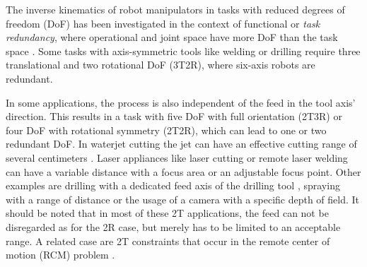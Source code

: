 \documentclass[graybox,vecphys]{svmult}
\begin{document}


The inverse kinematics of robot manipulators in tasks with reduced degrees of freedom (DoF) has been investigated in the context of functional or \emph{task redundancy}, where operational and joint space have more DoF than the task space \cite{SciaviccoSic2012}.
Some tasks with axis-symmetric tools like welding \cite{Baron2000,HuoBar2008} or drilling \cite{ZanchettinRocRobJoh2011,ZhuQuCaoYan2013} require three translational and two rotational DoF (3T2R), where six-axis robots are redundant.

In some applications, the process is 
also independent of the feed in the tool axis' direction. 
This results in a task with five DoF with full orientation (2T3R) or four DoF with rotational symmetry (2T2R), which can lead to one or two redundant DoF. 
In waterjet cutting the jet can have an effective cutting range of several centimeters \cite{BahlsFroHelDeu2017}. 
Laser appliances like laser cutting \cite{DolguiPas2009} or remote laser welding \cite{ErdoesKarKem2015} can have a variable distance with a focus area or an adjustable focus point.
Other examples are drilling with a dedicated feed axis of the drilling tool \cite{KoblerKotLexMaj2014}, spraying with a range of distance \cite{FromGra2010} or the usage of a camera with a specific depth of field. 
It should be noted that in most of these 2T applications, the feed can not be disregarded as for the 2R case, but merely has to be limited to an acceptable range.
A related case are 2T constraints that occur in the remote center of motion (RCM) problem \cite{SadeghianZokJaz2019, SandovalPoiVie2017}.
\end{document}

